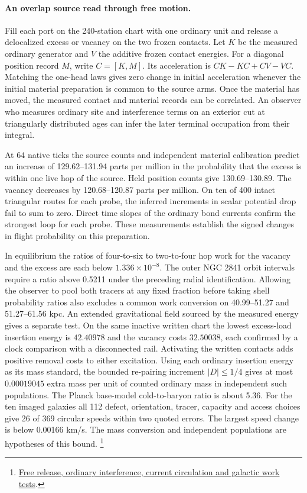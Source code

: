 \documentclass[11pt]{article}
\begin{document}
\paragraph{An overlap source read through free motion.}
Fill each port on the 240-station chart with one ordinary unit and
release a delocalized excess or vacancy on the two frozen contacts.
Let $K$ be the measured ordinary generator and $V$ the additive frozen
contact energies. For a diagonal position record $M$, write
$C=[K,M]$. Its acceleration is $CK-KC+CV-VC$. Matching the one-head
laws gives zero change in initial acceleration whenever the initial
material preparation is common to the source arms. Once the material
has moved, the measured contact and material records can be correlated.
An observer who measures ordinary site and interference terms on an
exterior cut at triangularly distributed ages can infer the later
terminal occupation from their integral.

At 64 native ticks the source counts and independent material calibration
predict an increase of 129.62--131.94 parts per million in the probability
that the excess is within one live hop of the source. Held position counts
give 130.69--130.89. The vacancy decreases by 120.68--120.87 parts per
million. On ten of 400 intact triangular routes for each probe, the
inferred increments in scalar potential drop fail to sum to zero.
Direct time slopes of the ordinary bond currents confirm the strongest
loop for each probe. These measurements establish the signed changes
in flight probability on this preparation.

In equilibrium the ratios of four-to-six to two-to-four hop work for the
vacancy and the excess are each below $1.336\times10^{-8}$. The outer
NGC 2841 orbit intervals require a ratio above 0.5211 under the preceding
radial identification. Allowing the observer to pool both tracers at
any fixed fraction before taking shell probability ratios also excludes
a common work conversion on 40.99--51.27 and 51.27--61.56 kpc.
An extended gravitational field sourced by the measured energy gives a
separate test. On the same inactive written chart the lowest excess-load
insertion energy is $42.40978$ and the vacancy costs $32.50038$, each
confirmed by a clock comparison with a disconnected rail. Activating
the written contacts adds positive removal costs to either excitation.
Using each ordinary insertion energy as its mass standard, the bounded
re-pairing increment $|D|\le 1/4$ gives at most $0.00019045$ extra mass
per unit of counted ordinary mass in independent such populations.
The Planck base-model cold-to-baryon ratio is about 5.36. For the ten
imaged galaxies all 112 defect, orientation, tracer, capacity and access
choices give 26 of 369 circular speeds within two quoted errors. The
largest speed change is below 0.00166 km/s. The mass conversion and
independent populations are hypotheses of this bound.%
\footnote{\href{https://github.com/FloatingPragma/observer-patch-holography/blob/main/model/experiments/interval_echo_shell_flux/product_address/green_response/material_recoil/overlap_source/native_boundary/stock/aperture/OCCUPIED_RESULTS.md}{Free release, ordinary interference, current circulation and galactic work tests}.}
\end{document}
